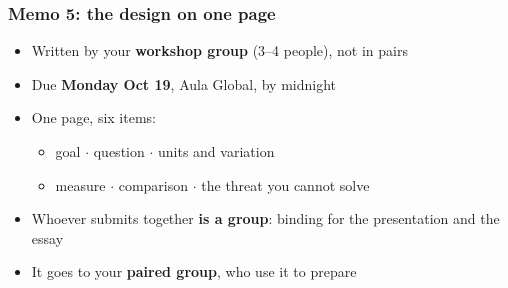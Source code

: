 \begin{frame}
\frametitle{Memo 5: the design on one page}
\centering

\begin{itemize}
  \item Written by your \textbf{workshop group} (3--4 people), not in pairs
  \vspace{4pt}
  \item Due \textbf{Monday Oct 19}, Aula Global, by midnight
  \vspace{8pt}
  \item<2-> One page, six items:
  \begin{itemize}
    \item goal $\cdot$ question $\cdot$ units and variation
    \item measure $\cdot$ comparison $\cdot$ the threat you cannot solve
  \end{itemize}
  \vspace{8pt}
  \item<3-> Whoever submits together \textbf{is a group}: binding for the presentation and the essay
  \vspace{4pt}
  \item<3-> It goes to your \textbf{paired group}, who use it to prepare
\end{itemize}

\end{frame}

